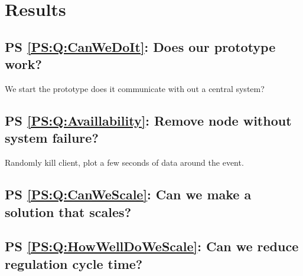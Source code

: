 
\chapter{Results}

\section{PS \ref{PS:Q:CanWeDoIt}: Does our prototype work?}
We start the prototype does it communicate with out a central system?


\section{PS \ref{PS:Q:Availlability}: Remove node without system failure?}
Randomly kill client, plot a few seconds of data around the event.

\section{PS \ref{PS:Q:CanWeScale}: Can we make a solution that scales?}




\section{PS \ref{PS:Q:HowWellDoWeScale}: Can we reduce regulation cycle time?}



